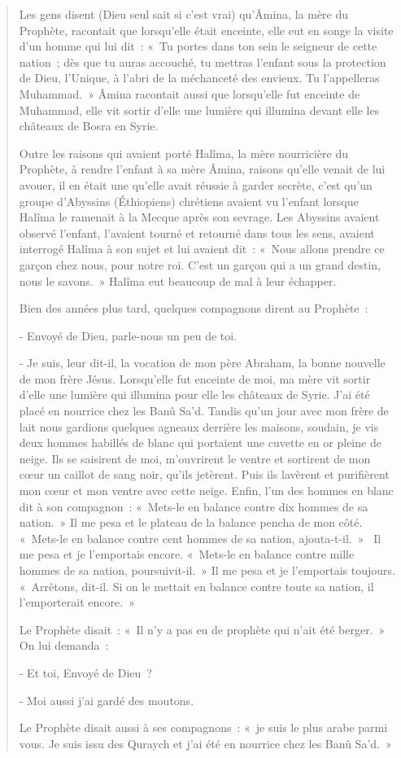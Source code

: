 \begin{quotation}
    

Les gens disent (Dieu seul sait si c'est vrai) qu'Âmina, la mère du
Prophète, racontait que lorsqu'elle était enceinte, elle eut en songe la
visite d'un homme qui lui dit~: «~Tu portes dans ton sein le seigneur de
cette nation~; dès que tu auras accouché, tu mettras l'enfant sous la
protection de Dieu, l'Unique, à l'abri de la méchanceté des envieux. Tu
l'appelleras Muhammad.~» Âmina racontait aussi que lorsqu'elle fut
enceinte de Muhammad, elle vit sortir d'elle une lumière qui illumina
devant elle les châteaux de Bosra en Syrie.

Outre les raisons qui avaient porté Halîma, la mère nourricière du
Prophète, à rendre l'enfant à sa mère Âmina, raisons qu'elle venait de
lui avouer, il en était une qu'elle avait réussie à garder secrète,
c'est qu'un groupe d'Abyssins (Éthiopiens) chrétiens avaient vu l'enfant
lorsque Halîma le ramenait à la Mecque après son sevrage. Les Abyssins
avaient observé l'enfant, l'avaient tourné et retourné dans tous les
sens, avaient interrogé Halîma à son sujet et lui avaient dit~: «~Nous
allons prendre ce garçon chez nous, pour notre roi. C'est un
garçon qui a un grand destin, nous le savons.~» Halîma eut beaucoup de
mal à leur échapper.

Bien des années plus tard, quelques compagnons dirent au Prophète~:

- Envoyé de Dieu, parle-nous un peu de toi.

- Je suis, leur dit-il, la vocation de mon père Abraham, la bonne
nouvelle de mon frère Jésus. Lorsqu'elle fut enceinte de moi, ma mère
vit sortir d'elle une lumière qui illumina pour elle les châteaux de
Syrie. J'ai été placé en nourrice chez les Banû Sa'd. Tandis qu'un jour
avec mon frère de lait nous gardions quelques agneaux derrière les
maisons, soudain, je vis deux hommes habillés de blanc qui portaient une
cuvette en or pleine de neige. Ils se saisirent de moi, m'ouvrirent le
ventre et sortirent de mon cœur un caillot de sang noir, qu'ils
jetèrent. Puis ils lavèrent et purifièrent mon cœur et mon ventre avec
cette neige. Enfin, l'un des hommes en blanc dit à son compagnon~:
«~Mets-le en balance contre dix hommes de sa nation.~» Il me pesa et le
plateau de la balance pencha de mon côté. «~Mets-le en balance contre
cent hommes de sa nation, ajouta-t-il.~»~ Il me pesa et je l'emportais
encore. «~Mets-le en balance contre mille hommes de sa nation,
poursuivit-il.~» Il me pesa et je l'emportais toujours. «~Arrêtons,
dit-il. Si on le mettait en balance contre toute sa nation, il
l'emporterait encore.~»

Le Prophète disait~: «~Il n'y a pas eu de prophète qui n'ait été
berger.~» On lui demanda~:

- Et toi, Envoyé de Dieu~?

- Moi aussi j'ai gardé des moutons.

Le Prophète disait aussi à ses compagnons~: «~je suis le plus arabe
parmi vous. Je suis issu des Quraych et j'ai été en nourrice chez les
Banû Sa'd.~»
\end{quotation}
